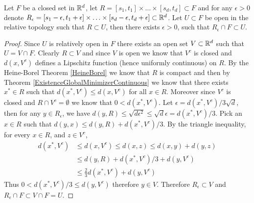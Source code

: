 \begin{lem}\label{banach:EuclideanRectangleThickening}Let $F$ be a closed set in $\mathbb{R}^d$, let $R = [s_1, t_1] \times \dotsc \times [s_d, t_d] \subset F$ and for any $\epsilon > 0$ denote $R_\epsilon = [s_1-\epsilon, t_1+ \epsilon] \times \dotsc \times [s_d - \epsilon, t_d + \epsilon] \subset \mathbb{R}^d$.   Let $U \subset F$ be open in the relative topology such that $R \subset U$,
  then there exists $\epsilon > 0$, such that $R_\epsilon \cap F \subset U$.
\end{lem}
\begin{proof}
  Since $U$ is relatively open in $F$ there exists an open set $V \subset \mathbb{R}^d$ such that $U = V \cap F$.   Clearly $R \subset V$ and since $V$ is open we know that $V^c$ is closed and $d(x, V^c)$ defines a Lipschitz function (hence uniformly continuous) on $R$.   By the Heine-Borel Theorem \ref{HeineBorel} we know that $R$ is compact and then by Theorem \ref{ExistenceGlobalMinimizerContinuous} we know that there exists $x^* \in R$ such that $d(x^*, V^c) \leq d(x, V^c)$ for all $x \in R$.   Moreover since $V^c$ is closed and $R \cap V^c = \emptyset$ we know that $0 < d(x^*, V^c)$.   Let $\epsilon = d(x^*, V^c)/3\sqrt{d}$, then for any $y \in R_\epsilon$, we have $d(y, R) \leq \sqrt{d \epsilon^2} \leq \sqrt{d} \epsilon = d(x^*, V^c)/3$.
   Pick an $x \in R$ such that $d(y, x) \leq d(y, R) + d(x^*, V^c)/3 $.   By the triangle inequality, for every $x \in R$, and $z \in V^c$,
  \begin{align*}
    d(x^*, V^c) &\leq d(x, V^c) \leq d(x, z) \leq d(x, y) + d(y, z) \\
                &\leq d(y, R) + d(x^*, V^c)/3 + d(y, V^c) \\
                &\leq  \frac{2}{3}d(x^*, V^c) + d(y, V^c) 
  \end{align*}
  Thus $0 < d(x^*,V^c)/3 \leq d(y, V^c)$ therefore $y \in V$.    Therefore $R_\epsilon \subset V$ and $R_\epsilon \cap F \subset V \cap F = U$.
\end{proof}

